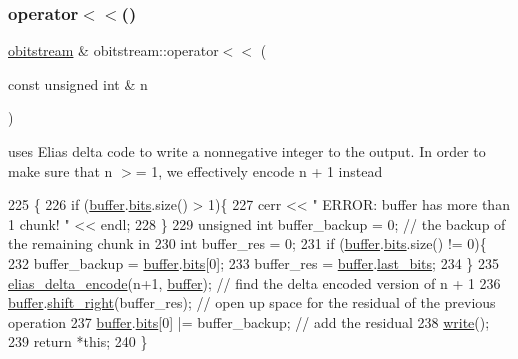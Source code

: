 \subsubsection{\texorpdfstring{operator$<$$<$()}{operator<<()}\hspace{0.1cm}{\footnotesize\ttfamily [1/2]}}
{\footnotesize\ttfamily \hyperlink{classobitstream}{obitstream} \& obitstream\+::operator$<$$<$ (\begin{DoxyParamCaption}\item[{const unsigned int \&}]{n }\end{DoxyParamCaption})}



uses Elias delta code to write a nonnegative integer to the output. In order to make sure that n $>$= 1, we effectively encode n + 1 instead 


\begin{DoxyCode}
225                                                          \{
226   \textcolor{keywordflow}{if} (\hyperlink{classobitstream_aeaccad00a395a404aa16472bfa052be3}{buffer}.\hyperlink{classbit__pipe_a86f38af1e9736b053728033490476b50}{bits}.size() > 1)\{
227     cerr << \textcolor{stringliteral}{" ERROR: buffer has more than 1 chunk! "} << endl;
228   \}
229   \textcolor{keywordtype}{unsigned} \textcolor{keywordtype}{int} buffer\_backup = 0; \textcolor{comment}{// the backup of the remaining chunk in }
230   \textcolor{keywordtype}{int} buffer\_res = 0; 
231   \textcolor{keywordflow}{if} (\hyperlink{classobitstream_aeaccad00a395a404aa16472bfa052be3}{buffer}.\hyperlink{classbit__pipe_a86f38af1e9736b053728033490476b50}{bits}.size() != 0)\{
232     buffer\_backup = \hyperlink{classobitstream_aeaccad00a395a404aa16472bfa052be3}{buffer}.\hyperlink{classbit__pipe_a86f38af1e9736b053728033490476b50}{bits}[0];
233     buffer\_res = \hyperlink{classobitstream_aeaccad00a395a404aa16472bfa052be3}{buffer}.\hyperlink{classbit__pipe_a0f3e84b02751803adaab499b5dad86fe}{last\_bits};
234   \}
235   \hyperlink{bitstream_8cpp_a63daa014203b9a5b2622a264cbfdff7b}{elias\_delta\_encode}(n+1, \hyperlink{classobitstream_aeaccad00a395a404aa16472bfa052be3}{buffer}); \textcolor{comment}{// find the delta encoded version of n + 1 }
236   \hyperlink{classobitstream_aeaccad00a395a404aa16472bfa052be3}{buffer}.\hyperlink{classbit__pipe_a341a1f62d728a67f730503ca722a7770}{shift\_right}(buffer\_res); \textcolor{comment}{// open up space for the residual of the previous
       operation}
237   \hyperlink{classobitstream_aeaccad00a395a404aa16472bfa052be3}{buffer}.\hyperlink{classbit__pipe_a86f38af1e9736b053728033490476b50}{bits}[0] |= buffer\_backup; \textcolor{comment}{// add the residual}
238   \hyperlink{classobitstream_a5ac23633932baad040856f0a33ee1ebf}{write}();
239   \textcolor{keywordflow}{return} *\textcolor{keyword}{this};
240 \}
\end{DoxyCode}
\mbox{\label{classobitstream_aed715e98e8b47e19e465da1445372229}} 
